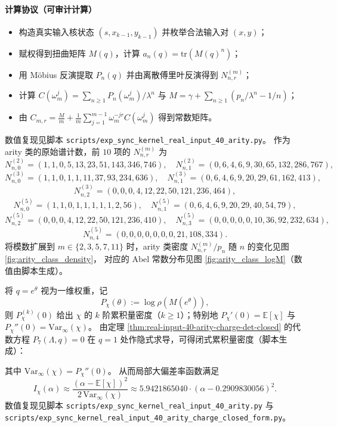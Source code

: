 \paragraph{计算协议（可审计计算）}
\begin{itemize}
  \item 构造真实输入核状态 $(s,x_{k-1},y_{k-1})$ 并枚举合法输入对 $(x,y)$；
  \item 赋权得到扭曲矩阵 $M(q)$，计算 $a_n(q)=\mathrm{tr}(M(q)^n)$；
  \item 用 Möbius 反演提取 $P_n(q)$ 并由离散傅里叶反演得到 $N_{n,r}^{(m)}$；
  \item 计算 $C(\omega_m^j)=\sum_{n\ge 1}P_n(\omega_m^j)/\lambda^n$ 与
  $M=\gamma+\sum_{n\ge 1}(p_n/\lambda^n-1/n)$；
  \item 由 $C_{m,r}=\frac{M}{m}+\frac{1}{m}\sum_{j=1}^{m-1}\omega_m^{-jr}C(\omega_m^j)$ 得到常数矩阵。
\end{itemize}
数值复现见脚本 \texttt{scripts/exp\_sync\_kernel\_real\_input\_40\_arity.py}。
作为 arity 类的原始谱计数，前 $10$ 项的 $N_{n,r}^{(m)}$ 为
\[
N_{n,0}^{(2)}=(1,1,0,5,13,23,51,143,346,746),\quad
N_{n,1}^{(2)}=(0,6,4,6,9,30,65,132,286,767),
\]
\[
N_{n,0}^{(3)}=(1,1,0,1,1,11,37,93,234,636),\quad
N_{n,1}^{(3)}=(0,6,4,6,9,20,29,61,162,413),
\]
\[
N_{n,2}^{(3)}=(0,0,0,4,12,22,50,121,236,464),
\]
\[
N_{n,0}^{(5)}=(1,1,0,1,1,1,1,1,2,56),\quad
N_{n,1}^{(5)}=(0,6,4,6,9,20,29,40,54,79),
\]
\[
N_{n,2}^{(5)}=(0,0,0,4,12,22,50,121,236,410),\quad
N_{n,3}^{(5)}=(0,0,0,0,0,10,36,92,232,634),
\]
\[
N_{n,4}^{(5)}=(0,0,0,0,0,0,0,21,108,334).
\]
将模数扩展到 $m\in\{2,3,5,7,11\}$ 时，arity 类密度 $N_{n,r}^{(m)}/p_n$ 随 $n$ 的变化见图 \ref{fig:arity_class_density}，
对应的 Abel 常数分布见图 \ref{fig:arity_class_logM}（数值由脚本生成）。


将 $q=e^\theta$ 视为一维权重，记
\[
P_\chi(\theta):=\log\rho(M(e^\theta)),
\]
则 $P_\chi^{(k)}(0)$ 给出 $\chi$ 的 $k$ 阶累积量密度（$k\ge 1$）；特别地
$P_\chi'(0)=\mathbb{E}[\chi]$ 与 $P_\chi''(0)=\mathrm{Var}_\infty(\chi)$。
由定理 \ref{thm:real-input-40-arity-charge-det-closed} 的代数方程 $P_7(\Lambda,q)=0$ 在 $q=1$ 处作隐式求导，可得闭式累积量密度（脚本生成）：

其中 $\mathrm{Var}_\infty(\chi)=P_\chi''(0)$。
从而局部大偏差率函数满足
\[
I_\chi(\alpha)\approx \frac{(\alpha-\mathbb{E}[\chi])^2}{2\,\mathrm{Var}_\infty(\chi)}
\approx 5.9421865040\cdot(\alpha-0.2909830056)^2.
\]
数值复现见脚本 \texttt{scripts/exp\_sync\_kernel\_real\_input\_40\_arity.py} 与
\texttt{scripts/exp\_sync\_kernel\_real\_input\_40\_arity\_charge\_closed\_form.py}。

